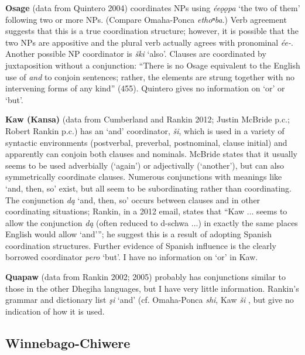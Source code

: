 \documentclass[output=paper]{LSP/langsci}
\begin{document}
\textbf{Osage} (data from Quintero 2004) coordinates NPs using \textit{\'ee\k{o}\k{o}pa} `the two of them' following two or more NPs. (Compare Omaha-Ponca \textit{ethoⁿba}.) Verb agreement suggests that this is a true coordination structure; however, it is possible that the two NPs are appositive and the plural verb actually agrees with pronominal \textit{\'ee-}. Another possible NP coordinator is \textit{\v{s}ki} `also'. Clauses are coordinated by juxtaposition without a conjunction: ``There is no Osage equivalent to the English use of \textit{and} to conjoin sentences; rather, the elements are strung together with no intervening forms of any kind'' (455). Quintero gives no information on `or' or `but'.

\textbf{Kaw (Kansa)} (data from Cumberland and Rankin 2012; Justin McBride p.c.; Robert Rankin p.c.) has an `and' coordinator, \textit{\v{s}i}, which is used in a variety of syntactic environments (postverbal, preverbal, postnominal, clause initial) and apparently can conjoin both clauses and nominals. McBride states that it usually seems to be used adverbially (`again') or adjectivally (`another'), but can also symmetrically coordinate clauses. Numerous conjunctions with meanings like `and, then, so' exist, but all seem to be subordinating rather than coordinating. The conjunction \textit{d\k{a}} `and, then, so' occurs between clauses and in other coordinating situations; Rankin, in a 2012 email, states that ``Kaw ... seems to allow the conjunction \textit{d\k{a}} (often reduced to d-schwa ...) in exactly the same places English would allow `and'''; he suggest this is a result of adopting Spanish coordination structures. Further evidence of Spanish influence is the clearly borrowed coordinator \textit{pero} `but'. I have no information on `or' in Kaw.

\textbf{Quapaw} (data from Rankin 2002; 2005) probably has conjunctions similar to those in the other Dhegiha languages, but I have very little information. Rankin's grammar and dictionary list \textit{\c{s}i} `and' (cf. Omaha-Ponca \textit{shi}, Kaw \textit{\v{s}i} , but give no indication of how it is used.

\subsection{Winnebago-Chiwere}
 
\end{document}
